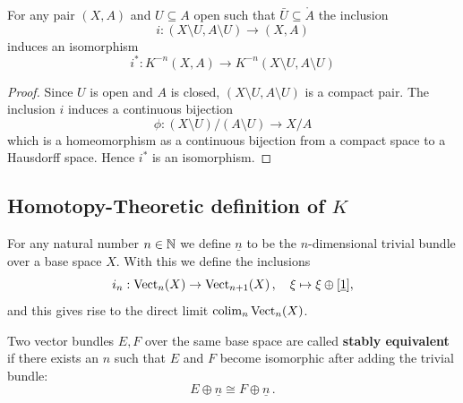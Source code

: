 \begin{theorem}[Excision]
	For any pair $(X,A)$ and $U\subseteq A$ open such that $\bar{U}\subseteq \mathring{A}$ the inclusion 
	\begin{equation*}
		i: (X\setminus U,A\setminus U) \to (X,A)
	\end{equation*} induces an isomorphism
	\begin{equation*}
		i^*:  K^{-n}(X,A)\to K^{-n}(X\setminus U,A\setminus U)
	\end{equation*}
\end{theorem}
\begin{proof}
	Since $U$ is open and $A$ is closed, $(X\setminus U,A\setminus U)$ is a compact pair. The inclusion $i$ induces a continuous bijection 
	\begin{equation*}
		\phi:(X\setminus U)\Big/(A\setminus U)\to X\big/ A
	\end{equation*} which is a homeomorphism as a continuous bijection from a compact space to a Hausdorff space. Hence $i^*$ is an isomorphism.
\end{proof}

\subsection{Homotopy-Theoretic definition of $K$}

\begin{definition}\label{def:kTheo-trivialBundleAndLimitInclusinos}
	For any natural number $n\in \mathbb{N}$ we define $\underline{n}$ to be the $n$-dimensional trivial bundle over a base space $X$. With this we define the inclusions
	\begin{equation*}
		i_n: \operatorname{\mathrm{Vect}}_n(X)\to \operatorname{\mathrm{Vect}}_{n+1}(X)\,,\quad \xi \mapsto \xi \oplus [\underline{1}],
	\end{equation*} and this gives rise to the direct limit $\operatorname{\mathrm{colim}}_n \operatorname{\mathrm{Vect}}_n(X)$.
\end{definition}
\begin{definition}
	Two vector bundles $E,F$ over the same base space are called \textbf{stably equivalent} if there exists an $n$ such that $E$ and $F$ become isomorphic after adding the trivial bundle: 
	\begin{equation*}
		E\oplus \underline{n}\cong F\oplus \underline{n}\,.
	\end{equation*}
\end{definition}

